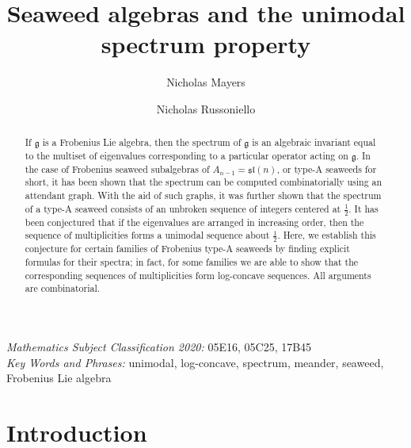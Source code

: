 \documentclass[letterpaper,10pt]{article}
\title{Seaweed algebras and the unimodal spectrum property}
\author[*]{Nicholas Mayers}
\author[**]{Nicholas Russoniello}
\affil[*]{Department of Mathematics, North Carolina State University, Raleigh, NC 27695}
\affil[**]{Department of Mathematics, College of William \& Mary, Williamsburg, VA 23185}
\begin{document}


\maketitle

\begin{abstract}
\noindent
If $\mathfrak{g}$ is a Frobenius Lie algebra, then the spectrum of $\mathfrak{g}$ is an algebraic invariant equal to the multiset of eigenvalues corresponding to a particular operator acting on $\mathfrak{g}$. In the case of Frobenius seaweed subalgebras of $A_{n-1}=\mathfrak{sl}(n)$, or type-A seaweeds for short, it has been shown that the spectrum can be computed combinatorially using an attendant graph. With the aid of such graphs, it was further shown that the spectrum of a type-A seaweed consists of an unbroken sequence of integers centered at $\frac{1}{2}$. It has been conjectured that if the eigenvalues are arranged in increasing order, then the sequence of multiplicities forms a unimodal sequence about $\frac{1}{2}$. Here, we establish this conjecture for certain families of Frobenius type-A seaweeds by finding explicit formulas for their spectra; in fact, for some families we are able to show that the corresponding sequences of multiplicities form log-concave sequences. All arguments are combinatorial.
\end{abstract}

\noindent
\textit{Mathematics Subject Classification 2020:} 05E16, 05C25, 17B45\\
\textit{Key Words and Phrases:} unimodal, log-concave, spectrum, meander, seaweed, Frobenius Lie algebra


\section{Introduction}
\end{document}
